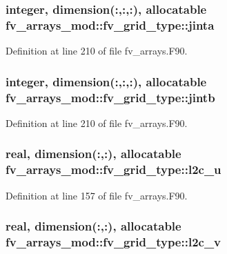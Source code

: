 \subsubsection[{jinta}]{\setlength{\rightskip}{0pt plus 5cm}integer, dimension(\-:,\-:,\-:), allocatable fv\-\_\-arrays\-\_\-mod\-::fv\-\_\-grid\-\_\-type\-::jinta}\label{structfv__arrays__mod_1_1fv__grid__type_a60627dd7ae4d9f748f6488474f45b1a0}


Definition at line 210 of file fv\-\_\-arrays.\-F90.

\subsubsection[{jintb}]{\setlength{\rightskip}{0pt plus 5cm}integer, dimension(\-:,\-:,\-:), allocatable fv\-\_\-arrays\-\_\-mod\-::fv\-\_\-grid\-\_\-type\-::jintb}\label{structfv__arrays__mod_1_1fv__grid__type_a4db483ba3f01be9b80617591e298a688}


Definition at line 210 of file fv\-\_\-arrays.\-F90.

\subsubsection[{l2c\-\_\-u}]{\setlength{\rightskip}{0pt plus 5cm}real, dimension(\-:,\-:), allocatable fv\-\_\-arrays\-\_\-mod\-::fv\-\_\-grid\-\_\-type\-::l2c\-\_\-u}\label{structfv__arrays__mod_1_1fv__grid__type_a55a06e29892a5836e8b5fc3822fa51e9}


Definition at line 157 of file fv\-\_\-arrays.\-F90.

\subsubsection[{l2c\-\_\-v}]{\setlength{\rightskip}{0pt plus 5cm}real, dimension(\-:,\-:), allocatable fv\-\_\-arrays\-\_\-mod\-::fv\-\_\-grid\-\_\-type\-::l2c\-\_\-v}\label{structfv__arrays__mod_1_1fv__grid__type_ab9c256610f44e1b093ece9c0c336e810}



